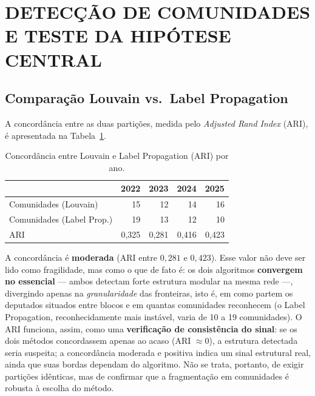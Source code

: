 \documentclass[
      12pt,
      a4paper,
      openright,
      oneside,
      chapter=TITLE,
      section=TITLE,
      english,
      french,
      spanish,
      brazilian
    ]{abntex2}
\begin{document}
    \section{DETECÇÃO DE COMUNIDADES E TESTE DA HIPÓTESE CENTRAL}
    
    \subsection{Comparação Louvain vs.\ Label Propagation}
    
    A concordância entre as duas partições, medida pelo \textit{Adjusted Rand Index} (ARI), é apresentada na Tabela~\ref{tab:ari}.
    
    \begin{table}[H]
    \centering
    \caption{Concordância entre Louvain e Label Propagation (ARI) por ano.}
    \label{tab:ari}
    \begin{tabular}{lrrrr}
    \toprule
     & \textbf{2022} & \textbf{2023} & \textbf{2024} & \textbf{2025} \\
    \midrule
    Comunidades (Louvain)          & 15    & 12    & 14    & 16    \\
    Comunidades (Label Prop.)      & 19    & 13    & 12    & 10    \\
    ARI                            & 0,325 & 0,281 & 0,416 & 0,423 \\
    \bottomrule
    \end{tabular}
    \end{table}
    
    A concordância é \textbf{moderada} (ARI entre $0{,}281$ e $0{,}423$). Esse valor não deve ser lido como fragilidade, mas como o que de fato é: os dois algoritmos \textbf{convergem no essencial} --- ambos detectam forte estrutura modular na mesma rede ---, divergindo apenas na \emph{granularidade} das fronteiras, isto é, em como partem os deputados situados entre blocos e em quantas comunidades reconhecem (o Label Propagation, reconhecidamente mais instável, varia de 10 a 19 comunidades). O ARI funciona, assim, como uma \textbf{verificação de consistência do sinal}: se os dois métodos concordassem apenas ao acaso (ARI $\approx 0$), a estrutura detectada seria suspeita; a concordância moderada e positiva indica um sinal estrutural real, ainda que suas bordas dependam do algoritmo. Não se trata, portanto, de exigir partições idênticas, mas de confirmar que a fragmentação em comunidades é robusta à escolha do método.
    
\end{document}

